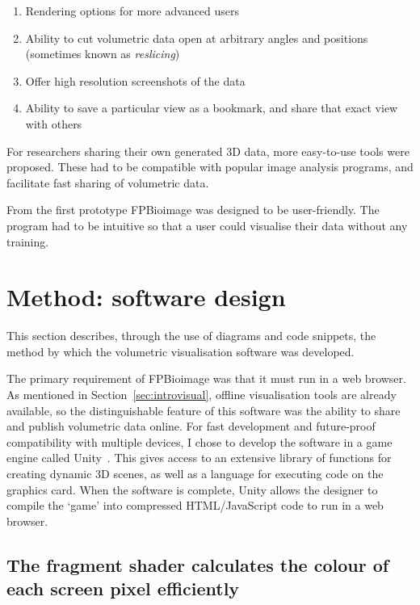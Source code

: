 \begin{enumerate}
	\item Rendering options for more advanced users
	\item Ability to cut volumetric data open at arbitrary angles and positions (sometimes known as \textit{reslicing})
	\item Offer high resolution screenshots of the data
	\item Ability to save a particular view as a bookmark, and share that exact view with others
\end{enumerate}

For researchers sharing their own generated 3D data, more easy-to-use tools were proposed. 
These had to be compatible with popular image analysis programs, and facilitate fast sharing of volumetric data. 

From the first prototype FPBioimage was designed to be user-friendly. 
The program had to be intuitive so that a user could visualise their data without any training. 

\section{Method: software design} \label{sec:fpbSoftwareDesign}
This section describes, through the use of diagrams and code snippets, the method by which the volumetric visualisation software was developed.

The primary requirement of FPBioimage was that it must run in a web browser.
As mentioned in Section~\ref{sec:introvisual}, offline visualisation tools are already available, so the distinguishable feature of this software was the ability to share and publish volumetric data online.
For fast development and future-proof compatibility with multiple devices, I chose to develop the software in a game engine called Unity~\cite{unity}.
This gives access to an extensive library of functions for creating dynamic 3D scenes, as well as a language for executing code on the graphics card.
When the software is complete, Unity allows the designer to compile the `game' into compressed HTML/JavaScript code to run in a web browser.

\subsection{The fragment shader calculates the colour of each screen pixel efficiently} \label{sec:shader}

